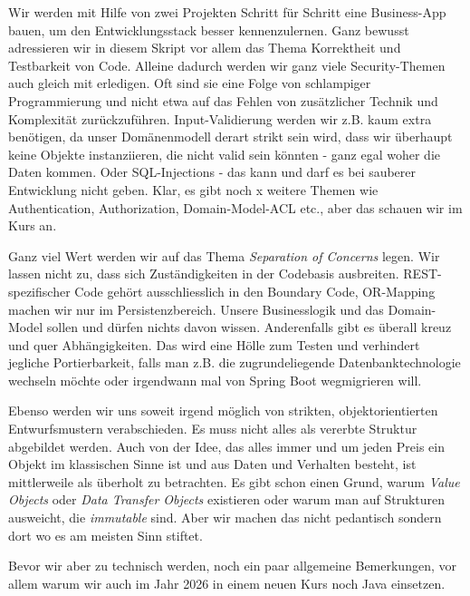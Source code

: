 Wir werden mit Hilfe von zwei Projekten Schritt für Schritt eine Business-App
bauen, um den Entwicklungsstack besser kennenzulernen. Ganz bewusst adressieren
wir in diesem Skript vor allem das Thema Korrektheit und Testbarkeit
von Code. Alleine dadurch werden wir ganz viele Security-Themen auch
gleich mit erledigen. Oft sind sie eine Folge von schlampiger Programmierung
und nicht etwa auf das Fehlen von zusätzlicher Technik und Komplexität
zurückzuführen. Input-Validierung werden wir z.B. kaum extra benötigen,
da unser Domänenmodell derart strikt sein wird, dass wir überhaupt
keine Objekte instanziieren, die nicht valid sein könnten - ganz 
egal woher die Daten kommen. Oder SQL-Injections - das kann und darf es bei
sauberer Entwicklung nicht geben. Klar, es gibt noch x weitere Themen
wie Authentication, Authorization, Domain-Model-ACL etc., aber das schauen
wir im Kurs an.

Ganz viel Wert werden wir auf das Thema \textit{Separation of Concerns}
legen. Wir lassen nicht zu, dass sich Zuständigkeiten in der Codebasis
ausbreiten. REST-spezifischer Code gehört ausschliesslich in den Boundary
Code, OR-Mapping machen wir nur im Persistenzbereich. Unsere
Businesslogik und das Domain-Model sollen und dürfen nichts davon wissen.
Anderenfalls gibt es überall kreuz und quer Abhängigkeiten. Das wird eine
Hölle zum Testen und verhindert jegliche Portierbarkeit, falls man
z.B. die zugrundeliegende Datenbanktechnologie wechseln möchte oder
irgendwann mal von Spring Boot wegmigrieren will.

Ebenso werden wir uns soweit irgend möglich von strikten, objektorientierten 
Entwurfsmustern verabschieden. Es muss nicht alles als vererbte Struktur 
abgebildet werden.
Auch von der Idee, das alles immer und um jeden Preis ein Objekt 
im klassischen Sinne ist und aus Daten und Verhalten
besteht, ist mittlerweile als überholt zu betrachten. Es gibt schon einen Grund, 
warum 
\textit{Value Objects} oder \textit{Data Transfer Objects} existieren oder 
warum man auf Strukturen ausweicht, die \textit{immutable} sind. Aber wir 
machen das nicht pedantisch sondern dort wo es am meisten Sinn stiftet.

Bevor wir aber zu technisch werden, noch ein paar allgemeine Bemerkungen,
vor allem warum wir auch im Jahr 2026 in einem neuen Kurs noch Java
einsetzen.

